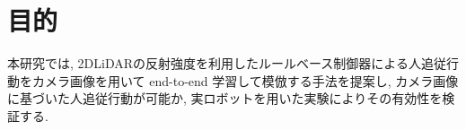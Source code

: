 
\section{目的}

本研究では, 2DLiDARの反射強度を利用したルールベース制御器による人追従行動をカメラ画像を用いて end-to-end 学習して模倣する手法を提案し, カメラ画像に基づいた人追従行動が可能か, 実ロボットを用いた実験によりその有効性を検証する.

\newpage
